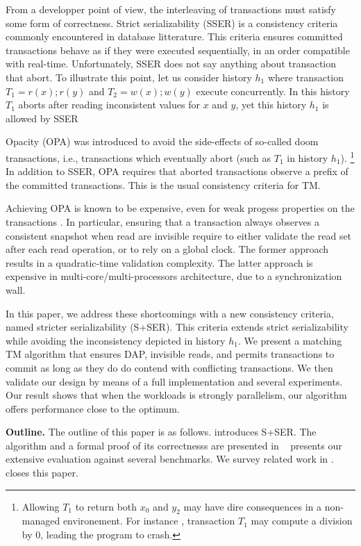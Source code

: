 From a developper point of view, the interleaving of transactions must satisfy some form of correctness.
Strict serializability (SSER) is a consistency criteria commonly encountered in database litterature.
This criteria ensures committed transactions behave as if they were executed sequentially, in an order compatible with real-time.
Unfortunately, SSER does not say anything about transaction that abort.
To illustrate this point, let us consider history $h_1$ where transaction $T_1=r(x);r(y)$ and $T_2=w(x);w(y)$ execute concurrently.
In this history $T_1$ aborts after reading inconsistent values for $x$ and $y$, yet this history $h_1$ is allowed by SSER 

Opacity (OPA) was introduced to avoid the side-effects of so-called doom transactions, i.e., transactions which eventually abort (such as $T_1$ in history $h_1$).%
\footnote{  
  Allowing $T_1$ to return both $x_0$ and $y_2$ may have dire consequences in a non-managed environement.
  For instance \cite{opa}, transaction $T_1$ may compute a division by $0$, leading the program to crash.
}
In addition to SSER, OPA requires that aborted transactions observe a prefix of the committed transactions.
This is the usual consistency criteria for TM.

Achieving OPA is known to be expensive, even for weak progess properties on the transactions \cite{}.
In particular, ensuring that a transaction always observes a consistent snapshot when read are invisible require to either validate the read set after each read operation, or to rely on a global clock.
The former approach results in a quadratic-time validation complexity.
The latter approach is expensive in multi-core/multi-processors architecture, due to a synchronization wall.

In this paper, we address these shortcomings with a new consistency criteria, named stricter serializability (S+SER).
This criteria extends strict serializability while avoiding the inconsistency depicted in history $h_1$.
We present a matching TM algorithm that ensures DAP, invisible reads, and permits transactions to commit as long as they do do contend with conflicting transactions.
We then validate our design by means of a full implementation and several experiments.
Our result shows that when the workloads is strongly parallelism, our algorithm offers performance close to the optimum.

\textbf{Outline.}
The outline of this paper is as follows.
 introduces S+SER.
The algorithm and a formal proof of its correctnesss are presented in ~
 presents our extensive evaluation against several benchmarks.
We survey related work in .
 closes this paper.
